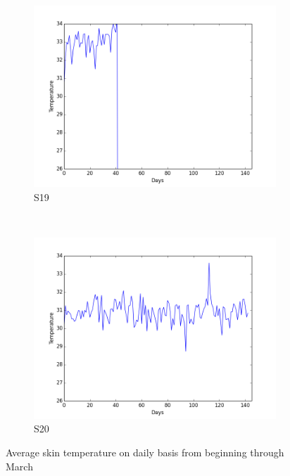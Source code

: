 \documentclass[12pt]{article} %
\begin{document}
\begin{figure}[H]
    \begin{subfigure}[b]{0.2\textwidth}
        \includegraphics[width=\textwidth]{img/graphs/19-skintemp-1}
        \caption{S19}
        \label{fig:s19ST}
    \end{subfigure}
    ~ %
    \begin{subfigure}[b]{0.2\textwidth}
        \includegraphics[width=\textwidth]{img/graphs/20-skintemp-1}
        \caption{S20}
        \label{fig:s20ST}
    \end{subfigure}
    \caption{Average skin temperature on daily basis from beginning through March}
    \label{fig:avgSkinTemp1}
\end{figure}
\end{document}
